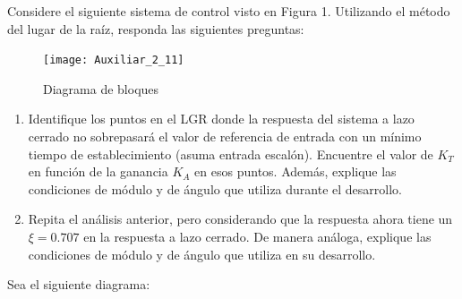 \documentclass[
  11pt,
  letterpaper,
   addpoints,
   answers
  ]{exam}
\begin{document}
\begin{questions}
    \question Considere el siguiente sistema de control visto en Figura 1. Utilizando el método del lugar de la raíz, responda las siguientes preguntas:
    \begin{figure}[h]
        \centering
        \texttt{[image: Auxiliar\_2\_11]}
        \caption{Diagrama de bloques}
    \end{figure}
    \begin{enumerate}
        \item Identifique los puntos en el LGR donde la respuesta del sistema a lazo cerrado no sobrepasará el valor de referencia de entrada con un mínimo tiempo de establecimiento (asuma entrada escalón). Encuentre el valor de \(K_T\) en función de la ganancia \(K_A\) en esos puntos. Además, explique las condiciones de módulo y de ángulo que utiliza durante el desarrollo.
        \item Repita el análisis anterior, pero considerando que la respuesta ahora tiene un \(\xi=0.707\) en la respuesta a lazo cerrado. De manera análoga, explique las condiciones de módulo y de ángulo que utiliza en su desarrollo.
    \end{enumerate}
    \newpage
    
   
    \question Sea el siguiente diagrama:
    \begin{center}

\end{center}
\end{questions}
\end{document}
